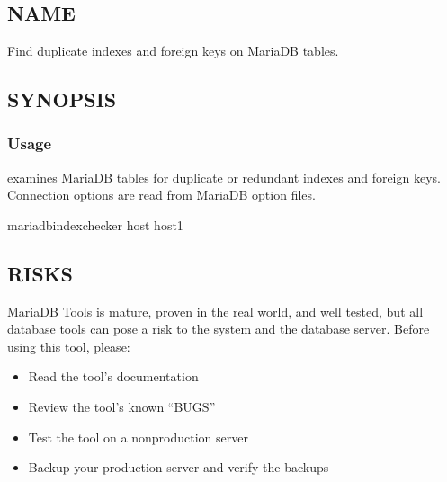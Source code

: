 \documentclass[letterpaper,10pt,english]{sphinxmanual}
\begin{document}
\chapter{}
\label{\detokenize{mariadb-index-checker:mariadb-index-checker}}\label{\detokenize{mariadb-index-checker::doc}}

\section{NAME}
\label{\detokenize{mariadb-index-checker:name}}
 \sphinxhyphen{} Find duplicate indexes and foreign keys on MariaDB tables.


\section{SYNOPSIS}
\label{\detokenize{mariadb-index-checker:synopsis}}

\subsection{Usage}
\label{\detokenize{mariadb-index-checker:usage}}
\begin{sphinxVerbatim}[commandchars=\\\{\}]
 \PYG{p}{[}\PYG{p}{]} \PYG{p}{[}\PYG{p}{]}
\end{sphinxVerbatim}

 examines MariaDB tables for duplicate or redundant
indexes and foreign keys.  Connection options are read from MariaDB option files.

\begin{sphinxVerbatim}[commandchars=\\\{\}]
mariadb\PYGZhy{}index\PYGZhy{}checker \PYGZhy{}\PYGZhy{}host host1
\end{sphinxVerbatim}


\section{RISKS}
\label{\detokenize{mariadb-index-checker:risks}}
MariaDB Tools is mature, proven in the real world, and well tested,
but all database tools can pose a risk to the system and the database
server.  Before using this tool, please:
\begin{itemize}
\item {} 
Read the tool’s documentation

\item {} 
Review the tool’s known “BUGS”

\item {} 
Test the tool on a non\sphinxhyphen{}production server

\item {} 
Backup your production server and verify the backups

\end{itemize}
\end{document}
